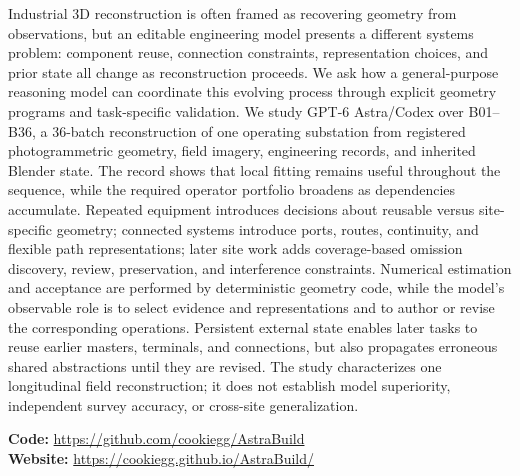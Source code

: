 \documentclass[10pt,a4paper]{article}
\begin{document}
\vspace{0.9em}

\vspace{0.15em}
\vspace{0.15em}
\vspace{1.0em}

{\small Industrial 3D reconstruction is often framed as recovering geometry from
observations, but an editable engineering model presents a different
systems problem: component reuse, connection constraints, representation
choices, and prior state all change as reconstruction proceeds. We ask
how a general-purpose reasoning model can coordinate this evolving
process through explicit geometry programs and task-specific validation.
We study GPT-6 Astra/Codex over B01--B36, a 36-batch reconstruction of
one operating substation from registered photogrammetric geometry, field
imagery, engineering records, and inherited Blender state. The record
shows that local fitting remains useful throughout the sequence, while
the required operator portfolio broadens as dependencies accumulate.
Repeated equipment introduces decisions about reusable versus
site-specific geometry; connected systems introduce ports, routes,
continuity, and flexible path representations; later site work adds
coverage-based omission discovery, review, preservation, and
interference constraints. Numerical estimation and acceptance are
performed by deterministic geometry code, while the model's observable
role is to select evidence and representations and to author or revise
the corresponding operations. Persistent external state enables later
tasks to reuse earlier masters, terminals, and connections, but also
propagates erroneous shared abstractions until they are revised. The
study characterizes one longitudinal field reconstruction; it does not
establish model superiority, independent survey accuracy, or cross-site
generalization.\par}
\vspace{0.8em}

\noindent\colorbox{black!6}{\parbox{\dimexpr\linewidth-2\fboxsep\relax}{\small\textbf{Code:} \url{https://github.com/cookiegg/AstraBuild}\\[2pt]\textbf{Website:} \url{https://cookiegg.github.io/AstraBuild/}}}
\vspace{0.8em}
\end{document}
